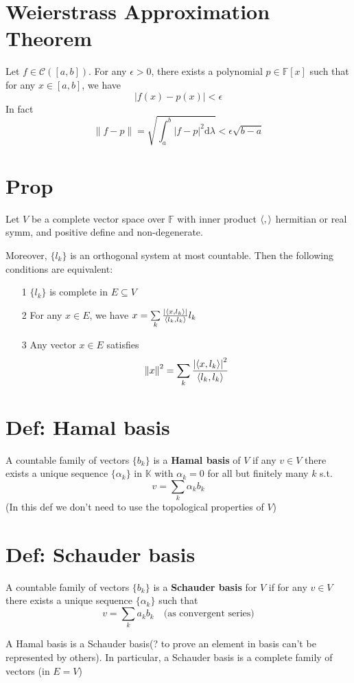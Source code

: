 \documentclass{book}
\newcommand{\abs}[1]{\left\lvert #1 \right\rvert}
\newcommand{\norm}[1]{\left\lVert #1 \right\rVert}
\begin{document}
\section{Weierstrass Approximation Theorem}
Let $f\in \mathcal{C}([a,b])$. For any $\epsilon>0$, there exists a polynomial $p\in \mathbb{F}[x]$ such that for any $x\in [a,b]$, we have
$$\abs{f(x)-p(x)}<\epsilon$$
In fact$$\norm{f-p}=\sqrt{\int_a^b\abs{f-p}^2\text{d}\lambda}<\epsilon\sqrt{b-a}$$
\section{Prop}
\label{Prop 63.1}
Let $V$ be a complete vector space over $\mathbb{F}$ with inner product $\left<,\right>$ hermitian or real symm, and positive define and non-degenerate.

Moreover, $\{l_k\}$ is an orthogonal system at most countable. Then the following conditions are equivalent:
\begin{itemize}
    \item [1]$\{l_k\}$ is complete in $E\subseteq V$
    \item [2]For any $x\in E$, we have $x=\sum\limits_{k}\frac{\abs{\inprod{x}{l_k}}}{\inprod{l_k}{l_k}}l_k$
    \item [3]Any vector $x\in E$ satisfies$$\norm{x}^2=\sum\limits_{k}\frac{\abs{\inprod{x}{l_k}}^2}{\inprod{l_k}{l_k}}$$
\end{itemize}
\section{Def: Hamal basis}A countable family of vectors $\{b_k\}$ is a \textbf{Hamal basis} of $V$ if any $v\in V$ there exists a unique sequence $\{\alpha_k\}$ in $\mathbb{K}$ with $\alpha_k=0$ for all but finitely many $k$ s.t. $$v=\sum\limits_k\alpha_kb_k$$
(In this def we don't need to use the topological properties of $V$)
\section{Def: Schauder basis}A countable family of vectors $\{b_k\}$ is a \textbf{Schauder basis} for $V$ if for any $v\in V$ there exists a unique sequence $\{\alpha_k\}$ such that$$v=\sum\limits_k a_kb_k\quad \text{(as convergent series)}$$

A Hamal basis is a Schauder basis(? to prove an element in basis can't be represented by others). In particular, a Schauder basis is a complete family of vectors (in $E=V$)
\end{document}
